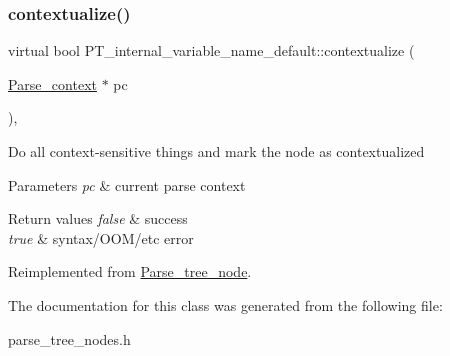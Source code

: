 \subsubsection{\texorpdfstring{contextualize()}{contextualize()}}
{\footnotesize\ttfamily virtual bool P\+T\+\_\+internal\+\_\+variable\+\_\+name\+\_\+default\+::contextualize (\begin{DoxyParamCaption}\item[{\mbox{\hyperlink{structParse__context}{Parse\+\_\+context}} $\ast$}]{pc }\end{DoxyParamCaption})\hspace{0.3cm}{\ttfamily [inline]}, {\ttfamily [virtual]}}

Do all context-\/sensitive things and mark the node as contextualized


\begin{DoxyParams}{Parameters}
{\em pc} & current parse context\\
\hline
\end{DoxyParams}

\begin{DoxyRetVals}{Return values}
{\em false} & success \\
\hline
{\em true} & syntax/\+O\+O\+M/etc error \\
\hline
\end{DoxyRetVals}


Reimplemented from \mbox{\hyperlink{classParse__tree__node_a22d93524a537d0df652d7efa144f23da}{Parse\+\_\+tree\+\_\+node}}.



The documentation for this class was generated from the following file\+:\begin{DoxyCompactItemize}
\item 
parse\+\_\+tree\+\_\+nodes.\+h\end{DoxyCompactItemize}
